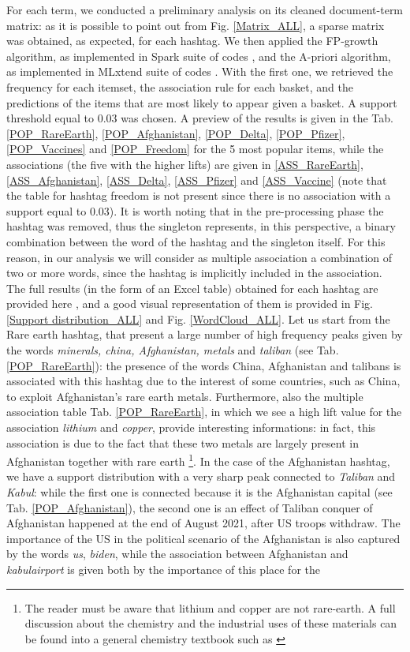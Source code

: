 \documentclass[12pt,%
               a4paper,%
               oneside,openany,%
               titlepage,%
               headinclude,footinclude,%
               BCOR5mm,%
               cleardoublepage=empty,%
               tablecaptionabove,%
               floatperchapter,
               ]{scrreprt}                 %
\begin{document}
For each term, we conducted a preliminary analysis on its cleaned document-term matrix: as it is possible to point out from Fig. \ref{Matrix_ALL}, a sparse matrix was obtained, as expected,  for each hashtag.  We then applied the FP-growth algorithm,  as implemented in Spark suite of codes \cite{zaharia2016apache} ,  and the A-priori algorithm,  as implemented in MLxtend suite of codes \cite{raschka2018mlxtend}. With the first one, we retrieved the frequency for each itemset,  the association rule for each basket, and the predictions of the items that are most likely to appear given a basket.  A support threshold equal to 0.03 was chosen. A preview of the results is given in the Tab. \ref{POP_RareEarth}, \ref{POP_Afghanistan}, \ref{POP_Delta}, \ref{POP_Pfizer},\ref{POP_Vaccines} and \ref{POP_Freedom}  for the 5 most popular items, while the associations (the five with the higher lifts) are given in \ref{ASS_RareEarth}, \ref{ASS_Afghanistan}, \ref{ASS_Delta}, \ref{ASS_Pfizer} and \ref{ASS_Vaccine} (note that the table for hashtag freedom is not present since there is no association with a support equal to 0.03). It is worth noting that in the pre-processing phase the hashtag was removed, thus the singleton represents, in this perspective, a binary combination between the word of the hashtag and the singleton itself. For this reason, in our analysis we will consider as multiple association a combination of two or more words, since the hashtag is implicitly included in the association. The full results (in the form of an Excel table) obtained for each hashtag are provided here \cite{Folder},  and a good visual representation of them is provided in Fig. \ref{Support distribution_ALL} and Fig. \ref{WordCloud_ALL}.  Let us start from the Rare earth hashtag, that present a large number of high frequency peaks given by the words \textit{minerals, china, Afghanistan, metals} and \textit{taliban} (see Tab. \ref{POP_RareEarth}): the presence of the words China, Afghanistan and talibans is associated with this hashtag due to the interest of some countries, such as China, to exploit Afghanistan’s rare earth metals. Furthermore, also the multiple association table Tab. \ref{POP_RareEarth}, in which we see a high lift value for the association \textit{lithium} and \textit{copper}, provide interesting informations: in fact, this association is due to the fact that these two metals are largely present in Afghanistan together with rare earth \footnote{The reader must be aware that lithium and copper are not rare-earth. A full discussion about the chemistry and the industrial uses of these materials can be found into a general chemistry textbook such as \cite{petrucci2010general}}. In the case of the Afghanistan hashtag, we have a support distribution with a very sharp peak connected to \textit{Taliban} and \textit{Kabul}: while the first one is connected because it is the Afghanistan capital (see Tab. \ref{POP_Afghanistan}), the second one is an effect of Taliban conquer of Afghanistan happened at the end of August 2021, after US troops withdraw. The importance of the US in the political scenario of the Afghanistan is also captured by the words \textit{us}, \textit{biden}, while the association between Afghanistan and \textit{kabulairport} is given both by the importance of this place for the 
\end{document}
